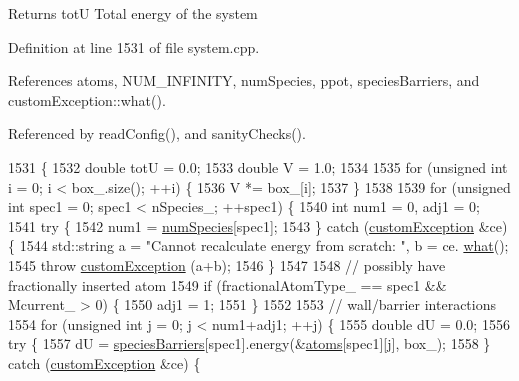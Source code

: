 \begin{DoxyReturn}{Returns}
tot\-U Total energy of the system 
\end{DoxyReturn}


Definition at line 1531 of file system.\-cpp.



References atoms, N\-U\-M\-\_\-\-I\-N\-F\-I\-N\-I\-T\-Y, num\-Species, ppot, species\-Barriers, and custom\-Exception\-::what().



Referenced by read\-Config(), and sanity\-Checks().


\begin{DoxyCode}
1531                                        \{
1532     \textcolor{keywordtype}{double} totU = 0.0;
1533     \textcolor{keywordtype}{double} V = 1.0;
1534 
1535     \textcolor{keywordflow}{for} (\textcolor{keywordtype}{unsigned} \textcolor{keywordtype}{int} i = 0; i < box\_.size(); ++i) \{
1536         V *= box\_[i];
1537     \}
1538 
1539     \textcolor{keywordflow}{for} (\textcolor{keywordtype}{unsigned} \textcolor{keywordtype}{int} spec1 = 0; spec1 < nSpecies\_; ++spec1) \{
1540         \textcolor{keywordtype}{int} num1 = 0, adj1 = 0;
1541         \textcolor{keywordflow}{try} \{
1542             num1 = \hyperlink{classsim_system_a9eea865e6dc1cff377b1e79c4d9c23f0}{numSpecies}[spec1];
1543         \} \textcolor{keywordflow}{catch} (\hyperlink{classcustom_exception}{customException} &ce) \{
1544             std::string a = \textcolor{stringliteral}{"Cannot recalculate energy from scratch: "}, b = ce.
      \hyperlink{classcustom_exception_aeb6ab5848b038adfc68fde86a512f691}{what}();
1545             \textcolor{keywordflow}{throw} \hyperlink{classcustom_exception}{customException} (a+b);
1546         \}
1547 
1548         \textcolor{comment}{// possibly have fractionally inserted atom}
1549         \textcolor{keywordflow}{if} (fractionalAtomType\_ == spec1 && Mcurrent\_ > 0) \{
1550             adj1 = 1;
1551         \}
1552 
1553         \textcolor{comment}{// wall/barrier interactions}
1554         \textcolor{keywordflow}{for} (\textcolor{keywordtype}{unsigned} \textcolor{keywordtype}{int} j = 0; j < num1+adj1; ++j) \{
1555             \textcolor{keywordtype}{double} dU = 0.0;
1556             \textcolor{keywordflow}{try} \{
1557                 dU = \hyperlink{classsim_system_a5ae652ff4519f39c3862abae32a9581b}{speciesBarriers}[spec1].energy(&\hyperlink{classsim_system_a90421b19082f7fb8fc23b7264b1161e4}{atoms}[spec1][j], box\_);
1558             \} \textcolor{keywordflow}{catch} (\hyperlink{classcustom_exception}{customException} &ce) \{

\end{DoxyCode}
